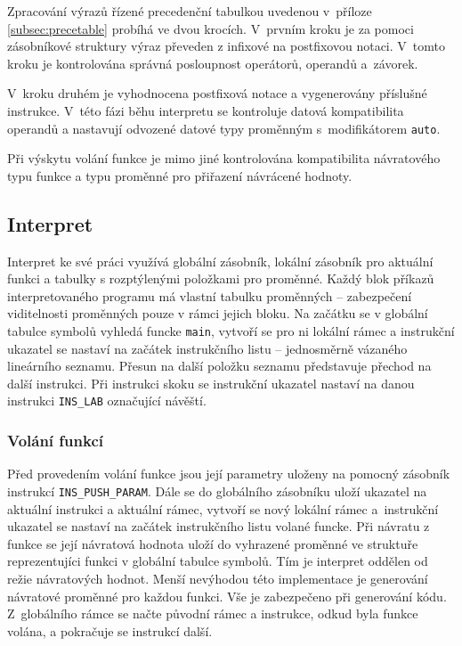 \documentclass[a4paper, 12pt]{article}
\begin{document}
Zpracování výrazů řízené precedenční tabulkou uvedenou v~příloze
\ref{subsec:precetable} probíhá ve dvou krocích. V~prvním kroku je za pomoci
zásobníkové struktury výraz převeden z infixové
na postfixovou notaci. V~tomto kroku je kontrolována správná posloupnost
operátorů, operandů a~závorek.

V~kroku druhém je vyhodnocena postfixová notace a vygenerovány příslušné 
instrukce. V~této fázi běhu interpretu se kontroluje datová kompatibilita 
operandů a nastavují odvozené datové typy proměnným s~modifikátorem 
\texttt{auto}.

Při výskytu volání funkce je mimo jiné kontrolována kompatibilita návratového
typu funkce a typu proměnné pro přiřazení návrácené hodnoty.

\subsection{Interpret} \label{interpret}
Interpret ke své práci využívá globální zásobník, lokální zásobník pro aktuální
funkci a tabulky s rozptýlenými položkami pro proměnné. Každý blok příkazů
interpretovaného programu má vlastní tabulku proměnných -- zabezpečení viditelnosti
proměnných pouze v rámci jejich bloku.
Na začátku se v globální tabulce symbolů vyhledá funcke \texttt{main},
vytvoří se pro ni lokální rámec a instrukční ukazatel se nastaví na začátek
instrukčního listu -- jednosměrně vázaného lineárního seznamu.
Přesun na další položku seznamu představuje přechod na další instrukci.
Při instrukci skoku se instrukční ukazatel nastaví
na danou instrukci \texttt{INS\_LAB} označující návěští.

\subsubsection{Volání funkcí}
Před provedením volání funkce jsou její parametry uloženy na pomocný zásobník
instrukcí \texttt{INS\_PUSH\_PARAM}. Dále se do globálního zásobníku uloží
ukazatel na aktuální instrukci a aktuální rámec, vytvoří se nový lokální rámec
a~instrukční ukazatel se nastaví na začátek instrukčního listu volané funcke.
Při návratu z funkce se její návratová hodnota uloží do vyhrazené
proměnné ve struktuře reprezentujíci funkci v globální tabulce symbolů.
Tím je interpret oddělen od režie návratových hodnot. Menší nevýhodou této
implementace je generování návratové proměnné pro každou funkci.
Vše je zabezpečeno při generování kódu. Z~globálního rámce se načte původní
rámec a instrukce, odkud byla funkce volána, a pokračuje se instrukcí další.
\end{document}
